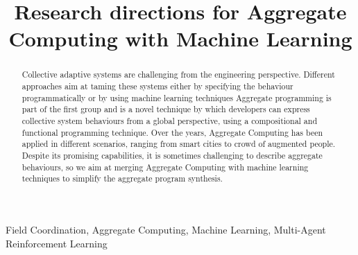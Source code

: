 \documentclass[conference]{IEEEtran}
\begin{document}
\title{Research directions for Aggregate Computing with Machine Learning}

\author{
}

\maketitle
\begin{abstract}
    Collective adaptive systems are challenging from the engineering perspective. 
%
    Different approaches aim at taming these systems either by specifying the behaviour programmatically or by using machine learning techniques
%
    Aggregate programming is part of the first group and is a novel technique by which developers can express collective system behaviours from a global perspective, using a compositional and functional programming technique.
%
    Over the years, Aggregate Computing has been applied in different scenarios, ranging from smart cities to crowd of augmented people. 
%
    Despite its promising capabilities, it is sometimes challenging to describe aggregate behaviours, so we aim at merging Aggregate Computing with machine learning techniques to simplify the aggregate program synthesis.
\end{abstract}
\begin{IEEEkeywords}
Field Coordination, Aggregate Computing, Machine Learning, Multi-Agent Reinforcement Learning
\end{IEEEkeywords}
\end{document}
